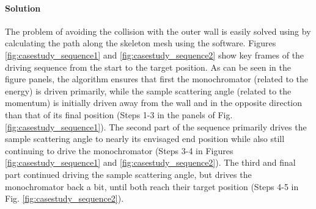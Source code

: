 \paragraph{Solution}
The problem of avoiding the collision with the outer wall  is easily solved using by calculating the 
path along the skeleton mesh using the software. Figures \ref{fig:casestudy_sequence1} and 
\ref{fig:casestudy_sequence2} show key frames of the driving sequence from the start to the 
target position.
As can be seen in the figure panels, the algorithm ensures that first the monochromator 
(related to the energy) is driven primarily, while the sample scattering angle (related to the momentum) 
is initially driven away from the wall and in the opposite direction than that of its final position (Steps 1-3
in the panels of Fig. \ref{fig:casestudy_sequence1}).
The second part of the sequence primarily drives the sample scattering angle to nearly its
envisaged end position while also still continuing to drive the monochromator (Steps 3-4
in Figures \ref{fig:casestudy_sequence1} and \ref{fig:casestudy_sequence2}).
The third and final part continued driving the sample scattering angle, but drives the monochromator
back a bit, until both reach their target position (Steps 4-5 in Fig. \ref{fig:casestudy_sequence2}).

